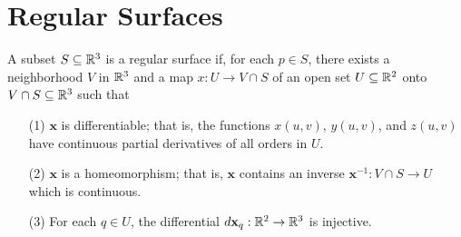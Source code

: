 \documentclass[a4paper]{article}
\begin{document}
\section{Regular Surfaces}

\begin{definition}
    A subset \( S \subseteq \mathbb{R}^{3} \) is a regular surface if, for each \( p \in S  \), there exists a neighborhood \( V  \) in \( \mathbb{R}^{3} \) and a map \( x: U \to V \cap S  \) of an open set \( U \subseteq  \mathbb{R}^{2} \) onto \( V \cap S \subseteq \mathbb{R}^{3}  \) such that 
    \begin{enumerate}
        \item[(1)] \( \textbf{x}   \) is differentiable; that is, the functions \( x(u,v)  \), \( y(u,v) \), and \( z(u,v) \) have continuous partial derivatives of all orders in \( U  \).
        \item[(2)] \( \textbf{x} \) is a homeomorphism; that is, \( \textbf{x} \) contains an inverse \( \textbf{x}^{-1}: V \cap S \to U  \) which is continuous.
        \item[(3)] For each \( q \in U  \), the differential \( d \textbf{x}_q : \mathbb{R}^{2} \to \mathbb{R}^{3} \) is injective.
    \end{enumerate}
\end{definition}
\end{document}
